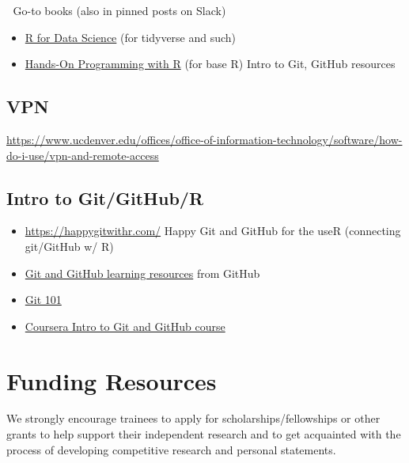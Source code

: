 \documentclass[
  letterpaper,
  DIV=11,
  numbers=noendperiod]{scrreprt}
\providecommand{\tightlist}{%
  \setlength{\itemsep}{0pt}\setlength{\parskip}{0pt}}\usepackage{longtable,booktabs,array}
\begin{document}
📌 Go-to books (also in pinned posts on Slack)

\begin{itemize}
\tightlist
\item
  \href{https://r4ds.had.co.nz/}{R for Data Science} (for tidyverse and
  such)
\item
  \href{https://rstudio-education.github.io/hopr/}{Hands-On Programming
  with R} (for base R) Intro to Git, GitHub resources
\end{itemize}

\hypertarget{vpn}{%
\section{VPN}\label{vpn}}

\url{https://www.ucdenver.edu/offices/office-of-information-technology/software/how-do-i-use/vpn-and-remote-access}

\hypertarget{intro-to-gitgithubr}{%
\section{Intro to Git/GitHub/R}\label{intro-to-gitgithubr}}

\begin{itemize}
\tightlist
\item
  \url{https://happygitwithr.com/} Happy Git and GitHub for the useR
  (connecting git/GitHub w/ R)
\item
  \href{https://docs.github.com/en/get-started/quickstart/git-and-github-learning-resources}{Git
  and GitHub learning resources} from GitHub
\item
  \href{https://product.hubspot.com/blog/git-and-github-tutorial-for-beginners}{Git
  101}
\item
  \href{https://www.coursera.org/learn/introduction-git-github}{Coursera
  Intro to Git and GitHub course}
\end{itemize}


\hypertarget{funding-resources}{%
\chapter{Funding Resources}\label{funding-resources}}

We strongly encourage trainees to apply for scholarships/fellowships or
other grants to help support their independent research and to get
acquainted with the process of developing competitive research and
personal statements.
\end{document}
